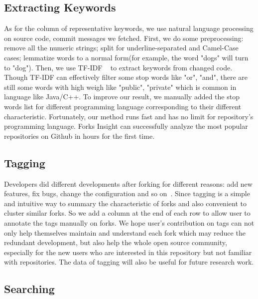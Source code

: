 \subsection{Extracting Keywords}
As for the column of representative keywords, we use natural language processing on source code, commit messages we fetched. First, we do some preprocessing: remove all the numeric strings; split for underline-separated and Camel-Case cases; lemmatize words to a normal form(for example, the word "dogs" will turn to "dog"). Then, we use TF-IDF ~\cite{salton1988term} to extract keywords from changed code. Though TF-IDF can effectively filter some stop words like "or", "and", there are still some words with high weigh like "public", "private" which is common in language like Java/C++. To improve our result, we manually added the stop words list for different programming language corresponding to their different characteristic.
Fortunately, our method runs fast and has no limit for repository's programming language. Forks Insight can successfully analyze the most popular repositories on Github in hours for the first time.

\subsection{Tagging}
Developers did different developments after forking for different reasons: add new features, fix bugs, change the configuration and so on~\cite{Mikkonen2011,Robles2012,dubinsky2013exploratory,stanciulescu2015forked}.
Since tagging is a simple and intuitive way to summary the characteristic of forks and also convenient to cluster similar forks. So we add a column at the end of each row to allow user to annotate the tags manually on forks. We hope user's contribution on tags can not only help themselves maintain and understand each fork which may reduce the redundant development, but also help the whole open source community, especially for the new users who are interested in this repository but not familiar with repositories. The data of tagging will also be useful for future research work.

\subsection{Searching}

